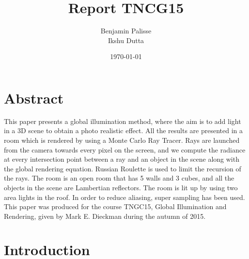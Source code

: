 \documentclass[12pt]{article}
\title{{Report TNCG15 }\\}
\author{Benjamin Palisse \\ Ikshu Dutta}
\date{\today}
\numberwithin{equation}{section}
\begin{document}
\maketitle

\section{Abstract}
This paper presents a global illumination method, where the aim is to add light in a 3D scene to obtain a photo realistic effect. All the results are presented in a room which is rendered by using a Monte Carlo Ray Tracer. Rays are launched from the camera towards every pixel on the screen, and we compute the radiance at every intersection point between a ray and an object in the scene along with the global rendering equation. Russian Roulette is used to limit the recursion of the rays. The room is an open room that has 5 walls and 3 cubes, and all the objects in the scene are Lambertian reflectors. The room is lit up by using two area lights in the roof. In order to reduce aliasing, super sampling has been used. This paper was produced for the course TNGC15, Global Illumination and Rendering, given by Mark E. Dieckman during the autumn of 2015.

\section{Introduction}
\end{document}
